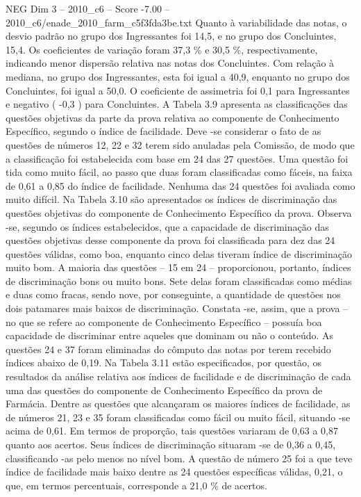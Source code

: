 \begin{textsample}{NEG Dim 3 – 2010\_c6 – Score -7.00 – 2010\_c6/enade\_2010\_farm\_c5f3fda3be.txt}
Quanto à variabilidade das notas, o desvio padrão no grupo dos Ingressantes foi 14,5, e no grupo dos Concluintes, 15,4.
Os coeficientes de variação foram 37,3 \% e 30,5 \%, respectivamente, indicando menor dispersão relativa nas notas dos Concluintes.
Com relação à mediana, no grupo dos Ingressantes, esta foi igual a 40,9, enquanto no grupo dos Concluintes, foi igual a 50,0.
O coeficiente de assimetria foi 0,1 para Ingressantes e negativo ( -0,3 ) para Concluintes.
A Tabela 3.9 apresenta as classificações das questões objetivas da parte da prova relativa ao componente de Conhecimento Específico, segundo o índice de facilidade.
Deve -se considerar o fato de as questões de números 12, 22 e 32 terem sido anuladas pela Comissão, de modo que a classificação foi estabelecida com base em 24 das 27 questões.
Uma questão foi tida como muito fácil, ao passo que duas foram classificadas como fáceis, na faixa de 0,61 a 0,85 do índice de facilidade.
Nenhuma das 24 questões foi avaliada como muito difícil.
Na Tabela 3.10 são apresentados os índices de discriminação das questões objetivas do componente de Conhecimento Específico da prova.
Observa -se, segundo os índices estabelecidos, que a capacidade de discriminação das questões objetivas desse componente da prova foi classificada para dez das 24 questões válidas, como boa, enquanto cinco delas tiveram índice de discriminação muito bom.
A maioria das questões – 15 em 24 – proporcionou, portanto, índices de discriminação bons ou muito bons.
Sete delas foram classificadas como médias e duas como fracas, sendo nove, por conseguinte, a quantidade de questões nos dois patamares mais baixos de discriminação.
Constata -se, assim, que a prova – no que se refere ao componente de Conhecimento Específico – possuía boa capacidade de discriminar entre aqueles que dominam ou não o conteúdo.
As questões 24 e 37 foram eliminadas do cômputo das notas por terem recebido índices abaixo de 0,19.
Na Tabela 3.11 estão especificados, por questão, os resultados da análise relativa aos índices de facilidade e de discriminação de cada uma das questões do componente de Conhecimento Específico da prova de Farmácia.
Dentre as questões que alcançaram os maiores índices de facilidade, as de números 21, 23 e 35 foram classificadas como fácil ou muito fácil, situando -se acima de 0,61.
Em termos de proporção, tais questões variaram de 0,63 a 0,87 quanto aos acertos.
Seus índices de discriminação situaram -se de 0,36 a 0,45, classificando -as pelo menos no nível bom.
A questão de número 25 foi a que teve índice de facilidade mais baixo dentre as 24 questões específicas válidas, 0,21, o que, em termos percentuais, corresponde a 21,0 \% de acertos.

\end{textsample}

